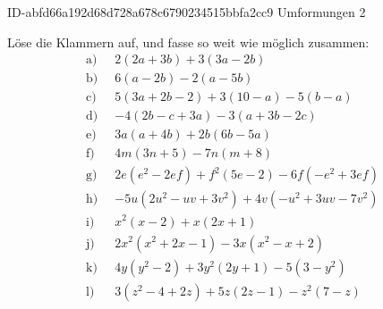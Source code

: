 \begin{exercise}
      {ID-abfd66a192d68d728a678c6790234515bbfa2cc9}
      {Umformungen 2}
  \ifproblem\problem\par
    \newcommand{\gap}{\;\;}%
    Löse die Klammern auf, und fasse so weit wie möglich zusammen:
    \allowdisplaybreaks
    \begin{equation*}
      \begin{split}
        \text{a)}\gap & 2(2a+3b)+3(3a-2b) \\
        \text{b)}\gap & 6(a-2b)-2(a-5b) \\
        \text{c)}\gap & 5(3a+2b-2)+3(10-a)-5(b-a) \\
        \text{d)}\gap & -4(2b-c+3a)-3(a+3b-2c) \\
        \text{e)}\gap & 3a(a+4b)+2b(6b-5a) \\
        \text{f)}\gap & 4m(3n+5)-7n(m+8) \\
        \text{g)}\gap & 2e(e^2-2ef)+f^2(5e-2)-6f(-e^2+3ef) \\
        \text{h)}\gap & -5u(2u^2-uv+3v^2)+4v(-u^2+3uv-7v^2) \\
        \text{i)}\gap & x^2(x-2)+x(2x+1) \\
        \text{j)}\gap & 2x^2(x^2+2x-1)-3x(x^2-x+2) \\
        \text{k)}\gap & 4y(y^2-2)+3y^2(2y+1)-5(3-y^2) \\
        \text{l)}\gap & 3(z^2-4+2z)+5z(2z-1)-z^2(7-z)
      \end{split}
    \end{equation*}
  \fi
  \ifoutcome\outcome\par
    \newcommand{\toprow}[2][20em]
    {%
      \makebox[#1][l]
      {%
        \ensuremath
        {%
          \displaystyle
          \phantom{\,=\:\,}%
          #2%
        }%
      }%
    }%
    \newcommand{\solutionA}[1]
    {%
      \begin{equation*}
        \begin{split}
          \text{a)} &\toprow[#1]{2(2a+3b)+3(3a-2b)} \\
                    &=           4a+6b+9a-6b        \\
                    &=           4a+9a+6b-6b        \\
                    &=           13a
        \end{split}
      \end{equation*}
}
\end{exercise}
